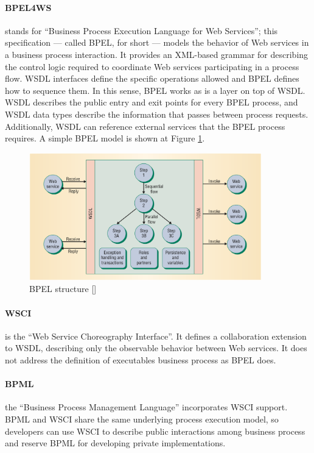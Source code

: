 \paragraph{BPEL4WS} 
stands for ``Business Process Execution Language for Web Services''; this specification — called BPEL, for short — models the behavior of Web services in a business process interaction. It provides an XML-based grammar for describing the control logic required to coordinate Web services participating in a process flow. WSDL interfaces define the specific operations allowed and BPEL defines how to sequence them. In this sense, BPEL works as is a layer on top of WSDL. WSDL describes the public entry and exit points for every BPEL process, and WSDL data types describe the information that passes between process requests. Additionally, WSDL can reference external services that the BPEL process requires. A simple BPEL model is shown at Figure \ref{BPELstructure}.

\begin{figure}[htb]
  \centering
  \includegraphics[width=0.9\textwidth]{images/BPELstructure}
  \caption{BPEL structure [\citet{WSOC}]}
  \label{BPELstructure}
\end{figure}

\paragraph{WSCI}
is the ``Web Service Choreography Interface''. It defines a collaboration extension to WSDL, describing only the observable behavior between Web services. It does not address the definition of executables business process as BPEL does.

\paragraph{BPML} 
the ``Business Process Management Language'' incorporates WSCI support. BPML and WSCI share the same underlying process execution model, so developers can use WSCI to describe public interactions among business process and reserve BPML for developing private implementations.

